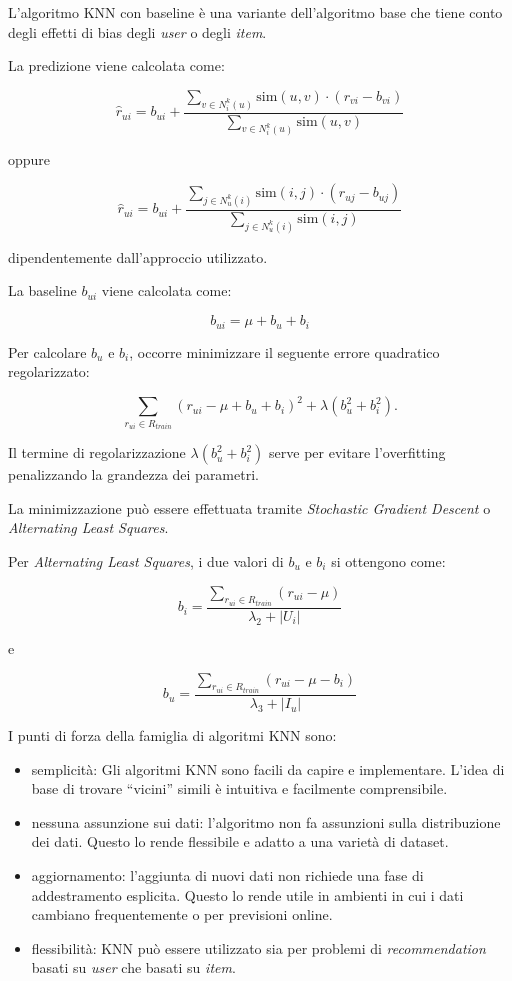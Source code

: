 L'algoritmo KNN con baseline \cite{KNN_baseline} è una variante dell'algoritmo base che tiene conto degli effetti di bias degli \textit{user} o degli \textit{item}.

La predizione viene calcolata come:

\[
\hat{r}_{ui} = b_{ui} + \frac{\sum\limits_{v \in N^k_i(u)} \text{sim}(u, v) \cdot (r_{vi} - b_{vi})}{\sum\limits_{v \in N^k_i(u)} \text{sim}(u, v)}
\]

oppure

\[
\hat{r}_{ui} = b_{ui} + \frac{\sum\limits_{j \in N^k_u(i)} \text{sim}(i, j) \cdot (r_{uj} - b_{uj})}{\sum\limits_{j \in N^k_u(i)} \text{sim}(i, j)}
\]

dipendentemente dall'approccio utilizzato.

La baseline $b_{ui}$ viene calcolata come:

\[
b_{ui} = \mu + b_u + b_i
\]

Per calcolare $b_u$ e $b_i$, occorre minimizzare il seguente errore quadratico regolarizzato:

\[
\sum\limits_{r_{ui} \in R_{train}} \left(r_{ui} - \mu + b_u + b_i\right)^2 + \lambda \left(b_u^2 + b_i^2 \right).
\]

Il termine di regolarizzazione $\lambda \left(b_u^2 + b_i^2 \right)$ serve per evitare l'overfitting penalizzando la grandezza dei parametri.

La minimizzazione può essere effettuata tramite \textit{Stochastic Gradient Descent} o \textit{Alternating Least Squares}.

Per \textit{Alternating Least Squares}, i due valori di $b_u$ e $b_i$ si ottengono come:

\[
b_i = \frac{\sum\limits_{r_{ui} \in R_{train}} (r_{ui} - \mu)}{\lambda_2 + |U_i|}
\]

e

\[
b_u = \frac{\sum\limits_{r_{ui} \in R_{train}} (r_{ui} - \mu - b_i)}{\lambda_3 + |I_u|}
\]

I punti di forza della famiglia di algoritmi KNN sono:
\begin{itemize}
    \item semplicità: Gli algoritmi KNN sono facili da capire e implementare. L'idea di base di trovare ``vicini'' simili è intuitiva e facilmente comprensibile.
    \item nessuna assunzione sui dati: l'algoritmo non fa assunzioni sulla distribuzione dei dati. Questo lo rende flessibile e adatto a una varietà di dataset.
    \item aggiornamento: l'aggiunta di nuovi dati non richiede una fase di addestramento esplicita. Questo lo rende utile in ambienti in cui i dati cambiano frequentemente o per previsioni online.
    \item flessibilità: KNN può essere utilizzato sia per problemi di \textit{recommendation} basati su \textit{user} che basati su \textit{item}.
\end{itemize}


